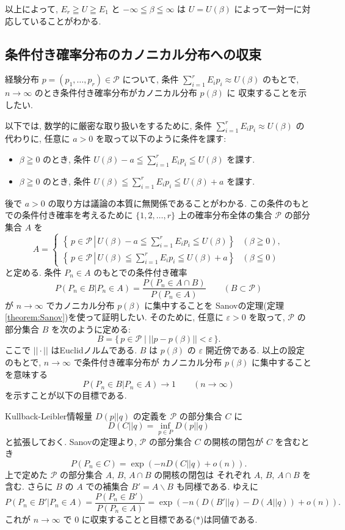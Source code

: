 \documentclass[12pt,twoside]{jarticle}
\newcommand\eps{\varepsilon}
\renewcommand\setminus{\smallsetminus}
\newcommand\cP{{\mathcal P}}
\theoremstyle{jplain}
\theoremstyle{jplain}
\theoremstyle{jplain}
\numberwithin{theorem}{section}
\numberwithin{equation}{section}
\numberwithin{figure}{section}
\numberwithin{table}{section}
\newcommand\theoremref[1]{定理\ref{#1}}
\begin{document}
以上によって, $E_r\geqq U\geqq E_1$ と $-\infty\leqq\beta\leqq\infty$
は $U=U(\beta)$ によって一対一に対応していることがわかる.


\subsection{条件付き確率分布のカノニカル分布への収束}

経験分布 $p=(p_1,\ldots,p_r)\in\cP$ について, 
条件 $\sum_{i=1}^r E_i p_i\approx U(\beta)$ のもとで,  
$n\to\infty$ のとき条件付き確率分布がカノニカル分布 $p(\beta)$ に
収束することを示したい.

以下では, 数学的に厳密な取り扱いをするために,
条件 $\sum_{i=1}^r E_i p_i\approx U(\beta)$ の代わりに,
任意に $a>0$ を取って以下のように条件を課す:
\begin{itemize}
\item $\beta\geqq 0$ のとき, 条件 \(
\displaystyle
U(\beta)-a \leqq \sum_{i=1}^r E_i p_i \leqq U(\beta)
\) を課す. 
\item $\beta\geqq 0$ のとき, 条件 \(
\displaystyle
U(\beta)\leqq \sum_{i=1}^r E_i p_i \leqq U(\beta)+a
\) を課す. 
\end{itemize}
後で $a>0$ の取り方は議論の本質に無関係であることがわかる.
この条件のもとでの条件付き確率を考えるために
$\{1,2,\ldots,r\}$ 上の確率分布全体の集合 $\cP$ の部分集合 $A$ を
\[
A =
\begin{cases}
\left\{\,p\in\cP \,\left|\, 
U(\beta)-a \leqq \sum_{i=1}^r E_i p_i \leqq U(\beta) \right.\right\} 
& (\beta\geqq 0), 
\\
\left\{\, p\in\cP \,\left|\, 
U(\beta)\leqq \sum_{i=1}^r E_i p_i \leqq U(\beta)+a \right.\right\} 
& (\beta\leqq 0)
\end{cases}
\]
と定める. 条件 $P_n\in A$ のもとでの条件付き確率
\[
P(P_n\in B|P_n\in A)=\frac{P(P_n\in A\cap B)}{P(P_n\in A)}
\qquad (B\subset\cP)
\]
が $n\to\infty$ でカノニカル分布 $p(\beta)$ に集中することを
Sanovの定理(\theoremref{theorem:Sanov})を使って証明したい. 
そのために, 任意に $\eps>0$ を取って, 
$\cP$ の部分集合 $B$ を次のように定める:
\[
B = \{\,p\in\cP \mid ||p-p(\beta)||<\eps \,\}.
\]
ここで $||\cdot||$ はEuclidノルムである.
$B$ は $p(\beta)$ の $\eps$ 開近傍である.
以上の設定のもとで, $n\to\infty$ で条件付き確率分布が
カノニカル分布 $p(\beta)$ に集中することを意味する
\[
P(P_n\in B|P_n\in A)\to 1
\qquad (n\to\infty)
\tag{$*$}
\]
を示すことが以下の目標である.

Kullback-Leibler情報量 $D(p||q)$ の定義を $\cP$ の部分集合 $C$ に
\[
D(C||q) = \inf_{p\in P}D(p||q)
\]
と拡張しておく. 
Sanovの定理より, $\cP$ の部分集合 $C$ の開核の閉包が $C$ を含むとき 
\[
P(P_n\in C) = \exp(-n D(C||q) + o(n)).
\]
上で定めた $\cP$ の部分集合 $A$, $B$, $A\cap B$ の開核の閉包は
それぞれ $A$, $B$, $A\cap B$ を含む. 
さらに $B$ の $A$ での補集合 $B'=A\setminus B$ も同様である.
ゆえに
\[
P(P_n\in B'|P_n\in A)
=\frac{P(P_n\in B')}{P(P_n\in A)}
=\exp(-n(D(B'||q)-D(A||q))+o(n)).
\]
これが $n\to\infty$ で $0$ に収束することと目標である($*$)は同値である.
\end{document}
